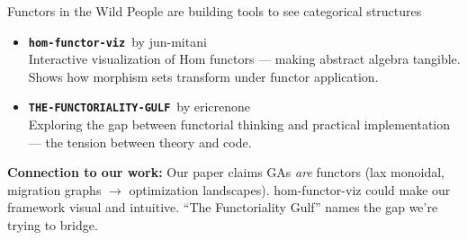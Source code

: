 \documentclass[aspectratio=169,14pt]{beamer}
\newcommand{\repo}[2]{\texttt{\color{geccoAccent}\bfseries #1}{\color{dimGray}\scriptsize\ by #2}}
\newcommand{\repoHL}[2]{\texttt{\color{geccoHighlight}\bfseries #1}{\color{dimGray}\scriptsize\ by #2}}
\newcommand{\bscore}[1]{{\color{geccoAccent}\bfseries #1}}
\newcommand{\connection}[1]{%
  \vspace{4pt}
  {\small\color{geccoHighlight}\textbf{Connection to our work:} \color{white}#1}}
\begin{document}
\begin{frame}{Functors in the Wild}
  {\small\color{dimGray} People are building tools to see categorical structures}
  \vspace{10pt}

  \begin{itemize}
    \item[\bscore{0.09}] \repo{hom-functor-viz}{jun-mitani}\\
      {\small Interactive visualization of Hom functors --- making abstract algebra tangible.
      Shows how morphism sets transform under functor application.}
    \vspace{8pt}
    \item[\bscore{0.05}] \repoHL{THE-FUNCTORIALITY-GULF}{ericrenone}\\
      {\small Exploring the gap between functorial thinking and practical implementation --- the tension between theory and code.}
  \end{itemize}

  \vspace{10pt}
  \connection{Our paper claims GAs \emph{are} functors (lax monoidal, migration graphs $\to$ optimization landscapes). hom-functor-viz could make our framework visual and intuitive. ``The Functoriality Gulf'' names the gap we're trying to bridge.}
\end{frame}
\end{document}
